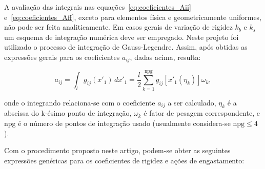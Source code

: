 A avaliação das integrais nas equações~\ref{eq:coeficientes_Aii} e~\ref{eq:coeficientes_Aff}, exceto para elementos física e geometricamente uniformes, não pode ser feita analiticamente. Em casos gerais de variação de rigidez $k_b$ e $k_s$ um esquema de integração numérica deve ser empregado. Neste projeto foi utilizado o processo de integração de Gauss-Legendre. Assim, após obtidas as expressões gerais para os coeficientes $a_{ij}$, dadas acima, resulta:

\begin{equation}
	\label{eq:gauss-legendre}
	a_{ij} = \int_l g_{ij}(x'_1)\,dx'_1 = \dfrac{l}{2}\sum_{k=1}^{\textrm{npg}} g_{ij}[x'_1(\eta_k)]\omega_k,
\end{equation}

onde o integrando relaciona-se com o coeficiente $a_{ij}$ a ser calculado, $\eta_k$ é a abscissa do k-ésimo ponto de integração, $\omega_k$ é fator de pesagem correspondente, e npg é o número de pontos de integração usado (usualmente considera-se $\textrm{npg} \leq 4$).

Com o procedimento proposto neste artigo, podem-se obter as seguintes expressões genéricas para os coeficientes de rigidez e ações de engastamento:
